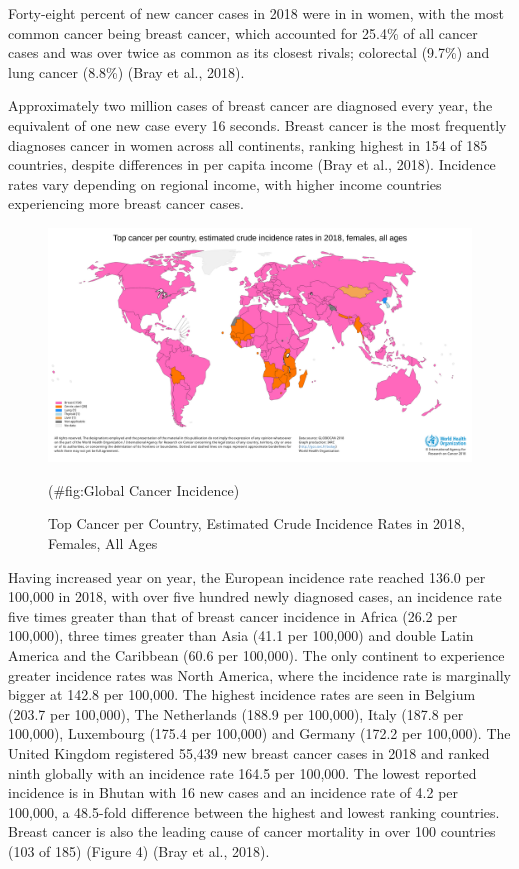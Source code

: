 \documentclass[a4paper, twoside]{templates/ociamthesis}
\begin{document}
Forty-eight percent of new cancer cases in 2018 were in in women, with the most common cancer being breast cancer, which accounted for 25.4\% of all cancer cases and was over twice as common as its closest rivals; colorectal (9.7\%) and lung cancer (8.8\%) (Bray et al., 2018).

Approximately two million cases of breast cancer are diagnosed every year, the equivalent of one new case every 16 seconds. Breast cancer is the most frequently diagnoses cancer in women across all continents, ranking highest in 154 of 185 countries, despite differences in per capita income (Bray et al., 2018). Incidence rates vary depending on regional income, with higher income countries experiencing more breast cancer cases.

\begin{figure}

{\centering \includegraphics[width=0.8\linewidth]{figures/Global Incidence} 

}

\caption{Top Cancer per Country, Estimated Crude Incidence Rates in 2018, Females, All Ages}(\#fig:Global Cancer Incidence)
\end{figure}

Having increased year on year, the European incidence rate reached 136.0 per 100,000 in 2018, with over five hundred newly diagnosed cases, an incidence rate five times greater than that of breast cancer incidence in Africa (26.2 per 100,000), three times greater than Asia (41.1 per 100,000) and double Latin America and the Caribbean (60.6 per 100,000). The only continent to experience greater incidence rates was North America, where the incidence rate is marginally bigger at 142.8 per 100,000.
The highest incidence rates are seen in Belgium (203.7 per 100,000), The Netherlands (188.9 per 100,000), Italy (187.8 per 100,000), Luxembourg (175.4 per 100,000) and Germany (172.2 per 100,000). The United Kingdom registered 55,439 new breast cancer cases in 2018 and ranked ninth globally with an incidence rate 164.5 per 100,000. The lowest reported incidence is in Bhutan with 16 new cases and an incidence rate of 4.2 per 100,000, a 48.5-fold difference between the highest and lowest ranking countries. Breast cancer is also the leading cause of cancer mortality in over 100 countries (103 of 185) (Figure 4) (Bray et al., 2018).
\end{document}
